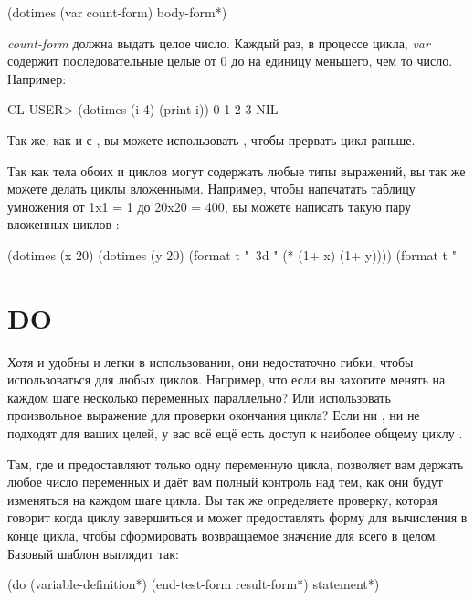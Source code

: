 \begin{myverb}
(dotimes (var count-form)
  body-form*)
\end{myverb}

\textit{count-form} должна выдать целое число. Каждый раз, в процессе цикла, \textit{var}
содержит последовательные целые от 0 до на единицу меньшего, чем то число.  Например:

\begin{myverb}
CL-USER> (dotimes (i 4) (print i))
0
1
2
3
NIL
\end{myverb}

Так же, как и с , вы можете использовать , чтобы прервать цикл
раньше.

Так как тела обоих  и  циклов могут содержать любые типы
выражений, вы так же можете делать циклы вложенными. Например, чтобы напечатать таблицу
умножения от 1x1 = 1 до 20x20 = 400, вы можете написать такую пару вложенных циклов
:

\begin{myverb}
(dotimes (x 20)
  (dotimes (y 20)
    (format t "~3d " (* (1+ x) (1+ y))))
  (format t "~%
\end{myverb}

\section{DO}

Хотя  и  удобны и легки в использовании, они недостаточно
гибки, чтобы использоваться для любых циклов. Например, что если вы захотите менять на
каждом шаге несколько переменных параллельно? Или использовать произвольное выражение для
проверки окончания цикла? Если ни , ни  не подходят для ваших
целей, у вас всё ещё есть доступ к наиболее общему циклу .

Там, где  и  предоставляют только одну переменную цикла,
 позволяет вам держать любое число переменных и даёт вам полный контроль над тем,
как они будут изменяться на каждом шаге цикла. Вы так же определяете проверку, которая
говорит когда циклу завершиться и может предоставлять форму для вычисления в конце цикла,
чтобы сформировать возвращаемое значение для всего  в целом. Базовый шаблон
выглядит так:

\begin{myverb}
(do (variable-definition*)
    (end-test-form result-form*)
  statement*)
\end{myverb}

